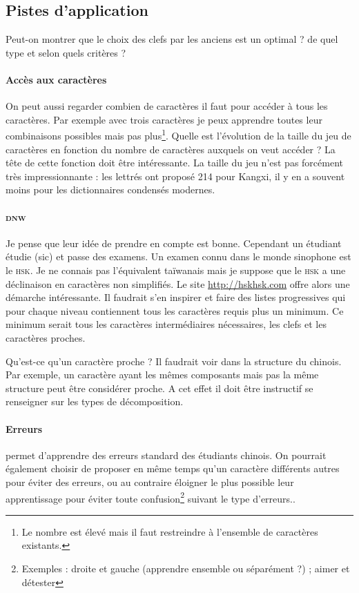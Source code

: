 \subsection{Pistes d'application}
Peut-on montrer que le choix des clefs par les anciens est un optimal ? de quel type et selon quels critères ?

\paragraph{Accès aux caractères} On peut aussi regarder combien de caractères il faut pour accéder à tous les caractères. Par exemple avec trois caractères je peux apprendre toutes leur combinaisons possibles mais pas plus\footnote{Le nombre est élevé mais il faut restreindre à l'ensemble de caractères existants.}. Quelle est l'évolution de la taille du jeu de caractères en fonction du nombre de caractères auxquels on veut accéder ? La tête de cette fonction doit être intéressante. La taille du jeu n'est pas forcément très impressionnante : les lettrés ont proposé 214 pour Kangxi, il y en a souvent moins pour les dictionnaires condensés modernes.

\paragraph{\textsc{dnw}}Je pense que leur idée de prendre en compte  est bonne. Cependant un étudiant étudie (sic) et passe des examens. Un examen connu dans le monde sinophone est le \textsc{hsk}. Je ne connais pas l'équivalent taïwanais mais je suppose que le \textsc{hsk} a une déclinaison en caractères non simplifiés. Le site \url{http://hskhsk.com} offre alors une démarche intéressante. Il faudrait s'en inspirer et faire des listes progressives qui pour chaque niveau contiennent tous les caractères requis plus un minimum. Ce minimum serait tous les caractères intermédiaires nécessaires, les clefs et les caractères proches.

Qu'est-ce qu'un caractère proche ? Il faudrait voir dans la structure du chinois. Par exemple, un caractère ayant les mêmes composants mais pas la même structure peut être considérer proche. A cet effet il doit être instructif se renseigner sur les types de décomposition. 

\paragraph{Erreurs} permet d'apprendre des erreurs standard des étudiants chinois. On pourrait également choisir de proposer en même temps qu'un caractère différents autres pour éviter des erreurs, ou au contraire éloigner le plus possible leur apprentissage pour éviter toute confusion\footnote{Exemples : droite et gauche (apprendre ensemble ou séparément ?) ; aimer et détester} suivant le type d'erreurs..

